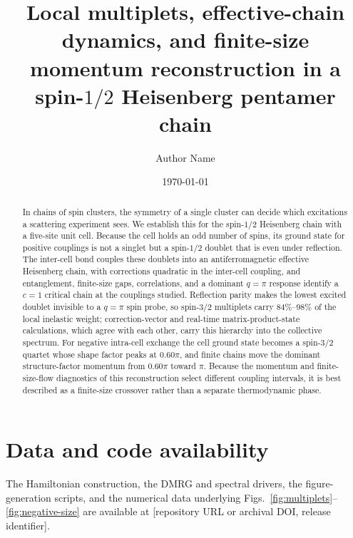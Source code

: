 \documentclass[
  aps,
  prb,
  reprint,
  amsmath,
  amssymb,
  superscriptaddress,
  longbibliography,
  nofootinbib,
  floatfix
]{revtex4-2}
\begin{document}
\title{Local multiplets, effective-chain dynamics, and finite-size momentum
reconstruction in a spin-\texorpdfstring{$1/2$}{1/2} Heisenberg pentamer chain}

\author{Author Name}

\date{\today}

\begin{abstract}
In chains of spin clusters, the symmetry of a single cluster can decide which
excitations a scattering experiment sees.
We establish this for the spin-$1/2$ Heisenberg chain with a five-site unit cell.
Because the cell holds an odd number of spins, its ground state for positive
couplings is not a singlet but a spin-$1/2$ doublet that is even under reflection.
The inter-cell bond couples these doublets into an antiferromagnetic effective
Heisenberg chain, with corrections quadratic in the inter-cell coupling, and
entanglement, finite-size gaps, correlations, and a dominant $q=\pi$ response
identify a $c=1$ critical chain at the couplings studied.
Reflection parity makes the lowest excited doublet invisible to a $q=\pi$ spin
probe, so spin-$3/2$ multiplets carry $84\%$--$98\%$ of the local inelastic
weight; correction-vector and real-time matrix-product-state calculations, which
agree with each other, carry this hierarchy into the collective spectrum.
For negative intra-cell exchange the cell ground state becomes a spin-$3/2$
quartet whose shape factor peaks at $0.60\pi$, and finite chains move the dominant
structure-factor momentum from $0.60\pi$ toward $\pi$.
Because the momentum and finite-size-flow diagnostics of this reconstruction
select different coupling intervals, it is best described as a finite-size
crossover rather than a separate thermodynamic phase.
\end{abstract}

\maketitle







\begin{acknowledgments}
\end{acknowledgments}

\section*{Data and code availability}
The Hamiltonian construction, the DMRG and spectral drivers, the figure-generation
scripts, and the numerical data underlying
Figs.~\ref{fig:multiplets}--\ref{fig:negative-size} are available at
[repository URL or archival DOI, release identifier].

\setlength{\bibsep}{2.0pt plus 0.3ex}

\end{document}
